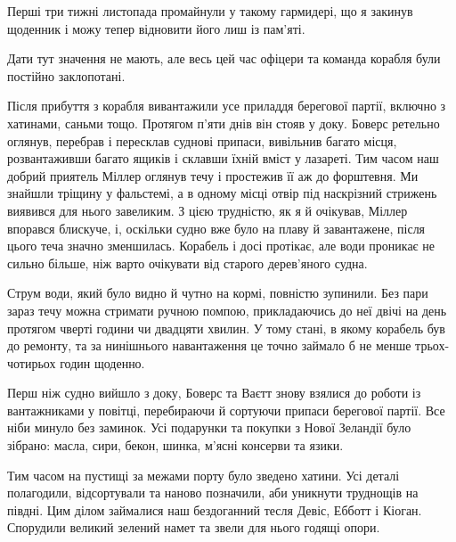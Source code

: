  
 
 
 
 


Перші три тижні листопада промайнули у такому гармидері, що я закинув щоденник
і можу тепер відновити його лиш із пам’яті.

Дати тут значення не мають, але весь цей час офіцери та команда корабля були
постійно заклопотані.

Після прибуття з корабля вивантажили усе приладдя берегової партії, включно з
хатинами, саньми тощо. Протягом п’яти днів він стояв у доку. Боверс ретельно
оглянув, перебрав і пересклав суднові припаси, вивільнив багато місця,
розвантаживши багато ящиків і склавши їхній вміст у лазареті. Тим часом наш
добрий приятель Міллер оглянув течу і простежив її аж до форштевня. Ми знайшли
тріщину у фальстемі, а в одному місці отвір під наскрізний стрижень виявився
для нього завеликим. З цією трудністю, як я й очікував, Міллер впорався
блискуче, і, оскільки судно вже було на плаву й завантажене, після цього теча
значно зменшилась. Корабель і досі протікає, але води проникає не сильно
більше, ніж варто очікувати від старого дерев’яного судна.

Струм води, який було видно й чутно на кормі, повністю зупинили. Без пари зараз
течу можна стримати ручною помпою, прикладаючись до неї двічі на день протягом
чверті години чи двадцяти хвилин. У тому стані, в якому корабель був до
ремонту, та за нинішнього навантаження це точно займало б не менше
трьох-чотирьох годин щоденно.

Перш ніж судно вийшло з доку, Боверс та Ваєтт знову взялися до роботи із
вантажниками у повітці, перебираючи й сортуючи припаси берегової партії. Все
ніби минуло без заминок. Усі подарунки та покупки з Нової Зеландії було
зібрано: масла, сири, бекон, шинка, м’ясні консерви та язики.

Тим часом на пустищі за межами порту було зведено хатини. Усі деталі
полагодили, відсортували та наново позначили, аби уникнути труднощів на півдні.
Цим ділом займалися наш бездоганний тесля Девіс, Ебботт і Кіоган. Спорудили
великий зелений намет та звели для нього годящі опори.

